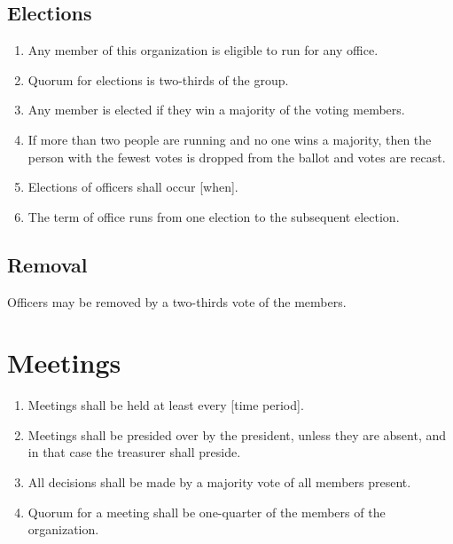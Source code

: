 \documentclass[12pt]{article}
\begin{document}
\subsection{Elections}
\begin{enumerate}
    \item Any member of this organization is eligible to run for any office.
    \item Quorum for elections is two-thirds of the group.
    \item Any member is elected if they win a majority of the voting members.
    \item If more than two people are running and no one wins a majority, then the person with the fewest votes is dropped from the ballot and votes are recast.
    
    \item Elections of officers shall occur [when].

    \item The term of office runs from one election to the subsequent election.
\end{enumerate}

\subsection{Removal}
Officers may be removed by a two-thirds vote of the members.

\section{Meetings}
\begin{enumerate}
    \item Meetings shall be held at least every [time period].

    \item Meetings shall be presided over by the president, unless they are absent, and in that case the treasurer shall preside.

    \item All decisions shall be made by a majority vote of all members present.
    \item Quorum for a meeting shall be one-quarter of the members of the organization.
\end{enumerate}
\end{document}
